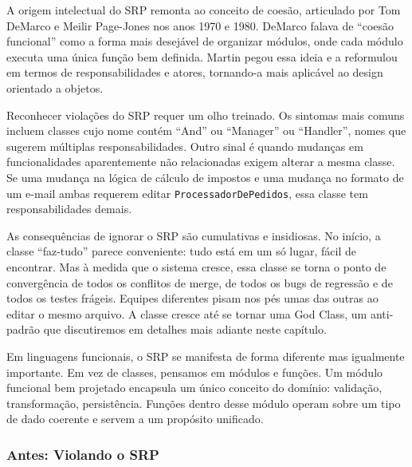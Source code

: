 A origem intelectual do SRP remonta ao conceito de coesão, articulado por Tom
DeMarco e Meilir Page-Jones nos anos 1970 e 1980. DeMarco falava de
``coesão funcional'' como a forma mais desejável de organizar módulos, onde
cada módulo executa uma única função bem definida. Martin pegou essa
ideia e a reformulou em termos de responsabilidades e atores, tornando-a mais
aplicável ao design orientado a objetos.

Reconhecer violações do SRP requer um olho treinado. Os sintomas
mais comuns incluem classes cujo nome contém ``And'' ou ``Manager'' ou
``Handler'', nomes que sugerem múltiplas responsabilidades. Outro sinal
é quando mudanças em funcionalidades aparentemente não relacionadas exigem
alterar a mesma classe. Se uma mudança na lógica de cálculo de impostos e
uma mudança no formato de um e-mail ambas requerem editar
\texttt{ProcessadorDePedidos}, essa classe tem responsabilidades demais.

As consequências de ignorar o SRP são cumulativas e insidiosas. No início, a
classe ``faz-tudo'' parece conveniente: tudo está em um só lugar, fácil de
encontrar. Mas à medida que o sistema cresce, essa classe se torna o ponto de
convergência de todos os conflitos de merge, de todos os bugs de regressão e
de todos os testes frágeis. Equipes diferentes pisam nos pés umas das outras
ao editar o mesmo arquivo. A classe cresce até se tornar uma God Class,
um anti-padrão que discutiremos em detalhes mais adiante neste capítulo.

Em linguagens funcionais, o SRP se manifesta de forma diferente mas igualmente
importante. Em vez de classes, pensamos em módulos e funções. Um módulo
funcional bem projetado encapsula um único conceito do domínio: validação,
transformação, persistência. Funções dentro desse módulo operam sobre um
tipo de dado coerente e servem a um propósito unificado.

\subsubsection{Antes: Violando o SRP}

